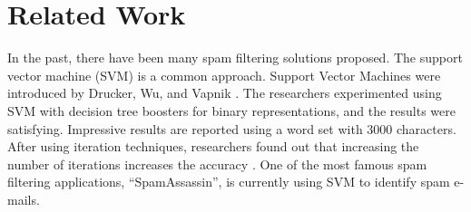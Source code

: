\section{Related Work}
In the past, there have been many spam filtering solutions proposed. The support vector machine (SVM) is a common approach. Support Vector Machines were introduced  by Drucker, Wu, and Vapnik \cite{svm}. The researchers experimented using SVM with decision tree boosters for binary representations, and the results were satisfying.
Impressive results are reported using a word set with 3000 characters. After using iteration techniques, researchers found out that increasing the number of iterations increases the accuracy \cite{sculley2007relaxed}. One of the most famous spam filtering applications, ``SpamAssassin'', is currently using SVM to identify spam e-mails. 

